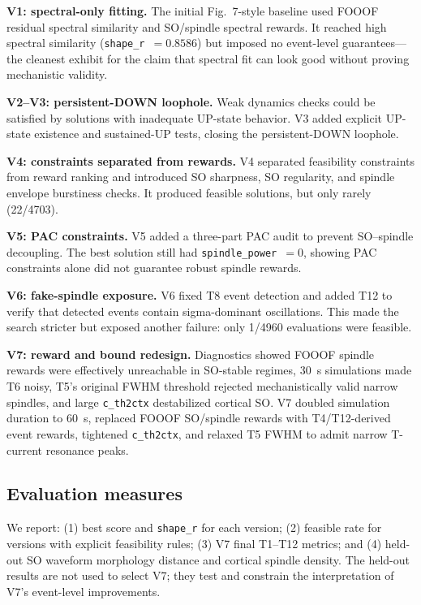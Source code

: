 \documentclass[conference]{IEEEtran}
\newcommand{\code}[1]{\texttt{#1}}
\begin{document}
\textbf{V1: spectral-only fitting.} The initial Fig.~7-style baseline used
FOOOF residual spectral similarity and SO/spindle spectral rewards. It reached
high spectral similarity (\code{shape\_r}~$=0.8586$) but imposed no event-level
guarantees---the cleanest exhibit for the claim that spectral fit can look good
without proving mechanistic validity.

\textbf{V2--V3: persistent-DOWN loophole.} Weak dynamics checks could be
satisfied by solutions with inadequate UP-state behavior. V3 added explicit
UP-state existence and sustained-UP tests, closing the persistent-DOWN
loophole.

\textbf{V4: constraints separated from rewards.} V4 separated feasibility
constraints from reward ranking and introduced SO sharpness, SO regularity, and
spindle envelope burstiness checks. It produced feasible solutions, but only
rarely (22/4703).

\textbf{V5: PAC constraints.} V5 added a three-part PAC audit to prevent
SO--spindle decoupling. The best solution still had \code{spindle\_power}~$=0$,
showing PAC constraints alone did not guarantee robust spindle rewards.

\textbf{V6: fake-spindle exposure.} V6 fixed T8 event detection and added T12 to
verify that detected events contain sigma-dominant oscillations. This made the
search stricter but exposed another failure: only 1/4960 evaluations were
feasible.

\textbf{V7: reward and bound redesign.} Diagnostics showed FOOOF spindle
rewards were effectively unreachable in SO-stable regimes, 30~s simulations made
T6 noisy, T5's original FWHM threshold rejected mechanistically valid narrow
spindles, and large \code{c\_th2ctx} destabilized cortical SO. V7 doubled
simulation duration to 60~s, replaced FOOOF SO/spindle rewards with
T4/T12-derived event rewards, tightened \code{c\_th2ctx}, and relaxed T5 FWHM to
admit narrow T-current resonance peaks.

\subsection{Evaluation measures}
We report: (1) best score and \code{shape\_r} for each version; (2) feasible
rate for versions with explicit feasibility rules; (3) V7 final T1--T12 metrics;
and (4) held-out SO waveform morphology distance and cortical spindle density.
The held-out results are not used to select V7; they test and constrain the
interpretation of V7's event-level improvements.
\end{document}
